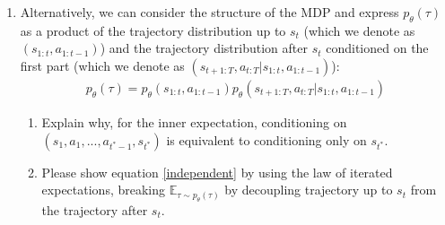 \documentclass[12pt]{article}
\begin{document}
\begin{enumerate} [label=(\alph*)]
\item Alternatively, we can consider the structure of the MDP and express $p_\theta(\tau)$ as a product of the trajectory distribution up to $s_t$ (which we denote as $(s_{1:t}, a_{1:t-1})$) and the trajectory distribution after $s_t$ conditioned on the first part (which we denote as $(s_{t+1:T}, a_{t:T} | s_{1:t}, a_{1:t-1})$):
    \begin{align*}
        p_\theta(\tau) = p_\theta(s_{1:t}, a_{1:t-1}) p_\theta(s_{t+1:T}, a_{t:T} | s_{1:t}, a_{1:t-1})
    \end{align*}
\begin{enumerate}
\item Explain why, for the inner expectation, conditioning on $(s_1, a_1, ..., a_{t^*-1}, s_{t^*})$ is equivalent to conditioning only on $s_{t^*}$.
\item Please show equation \ref{independent} by using the law of iterated expectations, breaking $\mathbb{E}_{\tau \sim p_\theta(\tau)}$ by decoupling trajectory up to $s_t$ from the trajectory after $s_t$.
\end{enumerate}


\end{enumerate}
\end{document}
